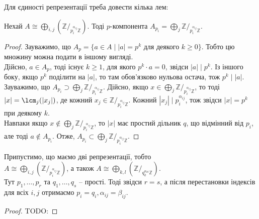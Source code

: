 \documentclass{math_library}
\begin{document}
Для єдиності репрезентації треба довести кілька лем:

\begin{lemma*}
Нехай $\displaystyle A \cong \bigoplus_{i,j} \left(\mathbb{Z}/_{p_i^{\alpha_{ij}} \mathbb{Z}}\right)$. Тоді $p$-компонента $A_{p_i} = \displaystyle\bigoplus_{j} \mathbb{Z}/_{p_i^{\alpha_{ij}} \mathbb{Z}}$.
\end{lemma*}

\begin{proof}
Зауважимо, що $A_p = \{a \in A \mid |a| = p^k \text{ для деякого } k\geq 0\}$. Тобто цю множину можна подати в іншому вигляді.\\
Дійсно, $a \in A_p$, тоді існує $k \geq 1$, для якого $p^k \cdot a = 0$, звідси $|a| \mid p^k$. Із іншого боку, якщо $p^k$ поділити на $|a|$, то там обов'язково нульова остача, тож $p^k \mid |a|$.
\bigskip \\
Зауважимо, що $A_{p_i} \supset \displaystyle\bigoplus_j \mathbb{Z}/_{p_i^{\alpha_{ij}} \mathbb{Z}}$. Дійсно, якщо $x \in \displaystyle\bigoplus_j \mathbb{Z}/_{p_i^{\alpha_{ij}} \mathbb{Z}}$, то тоді $|x| = \lcm_j(|x_j|)$, де кожний $x_j \in \mathbb{Z}/_{p_i^{\alpha_{ij}} \mathbb{Z}}$. Кожний $|x_j| \mid p_i^{\alpha_{ij}}$, тож звідси $|x| = p^k$ при деякому $k$.\\
Навпаки якщо $x \notin \displaystyle\bigoplus_j \mathbb{Z}/_{p_i^{\alpha_{ij}} \mathbb{Z}}$, то $|x|$ має простий дільник $q$, що відмінний від $p_i$, але тоді $a \notin A_{p_i}$. Отже, $A_{p_i} \subset \displaystyle\bigoplus_j \mathbb{Z}/_{p_i^{\alpha_{ij}} \mathbb{Z}}$.
\end{proof}

\begin{lemma*}
Припустимо, що маємо дві репрезентації, тобто\\
$\displaystyle A \cong \bigoplus_{i,j} \left(\mathbb{Z}/_{p_i^{\alpha_{ij}} \mathbb{Z}}\right)$, а також $\displaystyle A \cong \bigoplus_{k,l} \left(\mathbb{Z}/_{q_k^{\alpha_{kl}} \mathbb{Z}}\right)$.\\
Тут $p_1,\dots,p_r$ та $q_1,\dots,q_s$ -- прості. Тоді звідси $r = s$, а після перестановки індексів для всіх $i,j$ отримаємо $p_i = q_i, \alpha_{ij} = \beta_{ij}$.
\end{lemma*}

\begin{proof}
TODO:
\end{proof}

\begin{example}
\end{example}
\newpage
\end{document}
